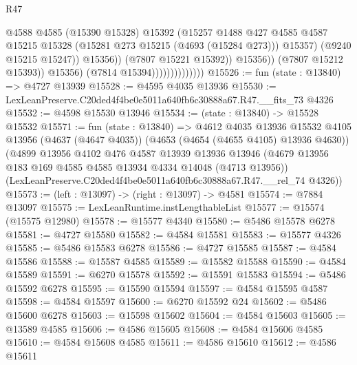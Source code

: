 \begin{lexlean}{R47}
\begin{coremodule}
                                              @4588
                                              @4585
                                              (@15390 @15328)
                                              @15392
                                              (@15257
                                                @1488
                                                @427
                                                @4585
                                                @4587
                                                @15215
                                                @15328
                                                (@15281 @273 @15215 (@4693 (@15284 @273)))
                                                @15357)
                                              (@9240 @15215 @15247))
                                            @15356))
                                        (@7807 @15221 @15392))
                                      @15356))
                                  (@7807 @15212 @15393))
                                @15356)
                              (@7814 @15394))))))))))))))
@15526 := fun (state : @13840) => @4727 @13939
@15528 := @4595 @4035 @13936
@15530 := LexLeanPreserve.C20ded4f4be0e5011a640fb6c30888a67.R47.__fits_73 @4326
@15532 := @4598 @15530 @13946
@15534 := (state : @13840) -> @15528 @15532
@15571 := fun (state : @13840) =>
  @4612
    @4035
    @13936
    @15532
    @4105
    @13956
    (@4637 (@4647 @4035))
    (@4653 (@4654 (@4655 @4105) @13936 @4630))
    (@4899
      @13956
      @4102
      @476
      @4587
      @13939
      @13936
      @13946
      (@4679 @13956 @183 @169 @4585 @4585 @13934 @4334 @14048 (@4713 @13956))
      (LexLeanPreserve.C20ded4f4be0e5011a640fb6c30888a67.R47.__rel_74 @4326))
@15573 := (left : @13097) -> (right : @13097) -> @4581
@15574 := @7884 @13097
@15575 := LexLeanRuntime.instLengthableList
@15577 := @15574 (@15575 @12980)
@15578 := @15577 @4340
@15580 := @5486 @15578 @6278
@15581 := @4727 @15580
@15582 := @4584 @15581
@15583 := @15577 @4326
@15585 := @5486 @15583 @6278
@15586 := @4727 @15585
@15587 := @4584 @15586
@15588 := @15587 @4585
@15589 := @15582 @15588
@15590 := @4584 @15589
@15591 := @6270 @15578
@15592 := @15591 @15583
@15594 := @5486 @15592 @6278
@15595 := @15590 @15594
@15597 := @4584 @15595 @4587
@15598 := @4584 @15597
@15600 := @6270 @15592 @24
@15602 := @5486 @15600 @6278
@15603 := @15598 @15602
@15604 := @4584 @15603
@15605 := @13589 @4585
@15606 := @4586 @15605
@15608 := @4584 @15606 @4585
@15610 := @4584 @15608 @4585
@15611 := @4586 @15610
@15612 := @4586 @15611

\end{coremodule}
\end{lexlean}
